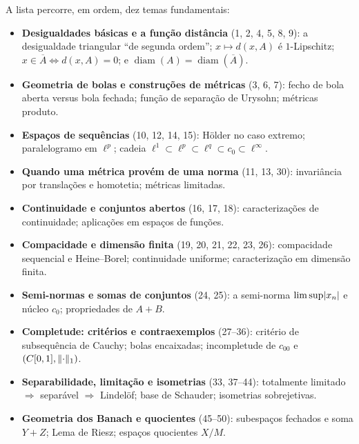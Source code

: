 \begin{tcolorbox}[
  enhanced,
  breakable,
  colback=myexamplebg,
  colframe=myexampleti,
  boxrule=0sp,
  borderline west={2.5pt}{0pt}{myexampleti},
  sharp corners,
  title=\textbf{Roteiro Temático da Lista},
  coltitle=myexampleti,
  fonttitle=\bfseries\sffamily,
  detach title,
  before upper=\tcbtitle\par\smallskip
]
A lista percorre, em ordem, dez temas fundamentais:
\begin{itemize}[leftmargin=1.4em,itemsep=2pt]
\item \textbf{Desigualdades básicas e a função distância} (1, 2, 4, 5, 8, 9): a desigualdade triangular ``de segunda ordem''; $x\mapsto d(x,A)$ é $1$-Lipschitz; $x\in\overline{A}\iff d(x,A)=0$; e $\operatorname{diam}(A)=\operatorname{diam}(\overline{A})$.
\item \textbf{Geometria de bolas e construções de métricas} (3, 6, 7): fecho de bola aberta versus bola fechada; função de separação de Urysohn; métricas produto.
\item \textbf{Espaços de sequências} (10, 12, 14, 15): Hölder no caso extremo; paralelogramo em $\ell^p$; cadeia $\ell^1\subset \ell^p\subset \ell^q\subset c_0\subset \ell^\infty$.
\item \textbf{Quando uma métrica provém de uma norma} (11, 13, 30): invariância por translações e homotetia; métricas limitadas.
\item \textbf{Continuidade e conjuntos abertos} (16, 17, 18): caracterizações de continuidade; aplicações em espaços de funções.
\item \textbf{Compacidade e dimensão finita} (19, 20, 21, 22, 23, 26): compacidade sequencial e Heine--Borel; continuidade uniforme; caracterização em dimensão finita.
\item \textbf{Semi-normas e somas de conjuntos} (24, 25): a semi-norma $\limsup\lvert x_n\rvert$ e núcleo $c_0$; propriedades de $A+B$.
\item \textbf{Completude: critérios e contraexemplos} (27--36): critério de subsequência de Cauchy; bolas encaixadas; incompletude de $c_{00}$ e $(C[0,1],\lVert\cdot\rVert_1)$.
\item \textbf{Separabilidade, limitação e isometrias} (33, 37--44): totalmente limitado $\Rightarrow$ separável $\Rightarrow$ Lindelöf; base de Schauder; isometrias sobrejetivas.
\item \textbf{Geometria dos Banach e quocientes} (45--50): subespaços fechados e soma $Y+Z$; Lema de Riesz; espaços quocientes $X/M$.
\end{itemize}
\end{tcolorbox}
